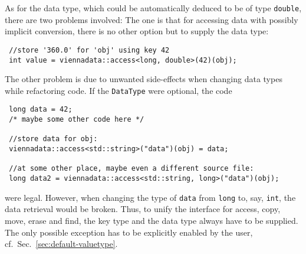 As for the data type, which could be automatically deduced to be of type \lstinline|double|, there are two problems involved:
The one is that for accessing data with possibly implicit conversion, there is no other option but to supply the data type:
\begin{lstlisting}
 //store '360.0' for 'obj' using key 42
 int value = viennadata::access<long, double>(42)(obj);
\end{lstlisting}
The other problem is due to unwanted side-effects when changing data types while refactoring code. If the \lstinline|DataType| were optional, the code
\begin{lstlisting}
 long data = 42;
 /* maybe some other code here */

 //store data for obj:
 viennadata::access<std::string>("data")(obj) = data;

 //at some other place, maybe even a different source file:
 long data2 = viennadata::access<std::string, long>("data")(obj);
\end{lstlisting}
were legal. However, when changing the type of \lstinline|data| from \lstinline|long| to, say, \lstinline|int|, the data retrieval would be broken.
Thus, to unify the interface for access, copy, move, erase and find, the key type and the data type always have to be supplied. 
The only possible exception has to be explicitly enabled by the user, cf.~Sec.~\ref{sec:default-valuetype}.



% 
% 

